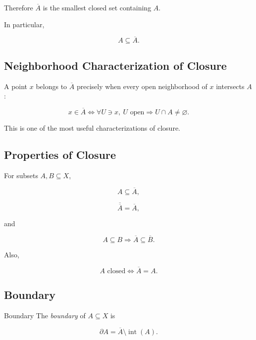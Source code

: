 Therefore \(\overline{A}\) is the smallest closed set containing \(A\).

In particular,

\[
\boxed{
A\subseteq\overline{A}.
}
\]

\subsection{Neighborhood Characterization of Closure}
\label{subsec:closure-neighborhood-characterization}

A point \(x\) belongs to \(\overline{A}\) precisely when every open
neighborhood of \(x\) intersects \(A\):

\[
\boxed{
x\in\overline{A}
\iff
\forall U\ni x,\ 
U\text{ open}
\Longrightarrow
U\cap A\neq\varnothing.
}
\]

This is one of the most useful characterizations of closure.

\subsection{Properties of Closure}
\label{subsec:closure-properties}

For subsets \(A,B\subseteq X\),

\[
\boxed{
A\subseteq\overline{A},
}
\]

\[
\boxed{
\overline{\overline{A}}
=
\overline{A},
}
\]

and

\[
\boxed{
A\subseteq B
\Longrightarrow
\overline{A}\subseteq\overline{B}.
}
\]

Also,

\[
\boxed{
A\text{ closed}
\iff
\overline{A}=A.
}
\]

\subsection{Boundary}
\label{subsec:topological-boundary}

\begin{definitionbox}{Boundary}
The \emph{boundary} of \(A\subseteq X\) is

\[
\boxed{
\partial A
=
\overline{A}
\setminus
\operatorname{int}(A).
}
\]
\end{definitionbox}

